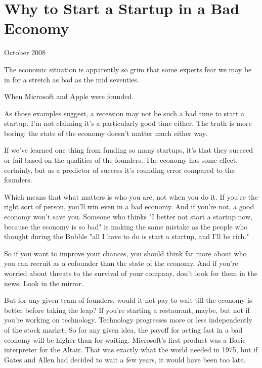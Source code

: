 \chapter{Why to Start a Startup in a Bad Economy}


            
              
                


                  
                    October 2008

The economic situation is apparently
                    so grim that some experts fear we may be in for a stretch as
                    bad as the mid seventies.

When Microsoft and
                    Apple were founded.

As those examples suggest, a
                    recession may not be such a bad time to start a startup. I'm
                    not claiming it's a particularly good time either. The truth
                    is more boring: the state of the economy doesn't matter much
                    either way.

If we've learned one thing from
                    funding so many startups, it's that they succeed or fail
                    based on the qualities of the founders. The economy has some
                    effect, certainly, but as a predictor of success it's
                    rounding error compared to the founders.

Which
                    means that what matters is who you are, not when you do it.
                    If you're the right sort of person, you'll win even in a bad
                    economy. And if you're not, a good economy won't save you.
                    Someone who thinks "I better not start a startup now,
                    because the economy is so bad" is making the same mistake as
                    the people who thought during the Bubble "all I have to do
                    is start a startup, and I'll be rich."

So if you
                    want to improve your chances, you should think far more
                    about who you can recruit as a cofounder than the state of
                    the economy. And if you're worried about threats to the
                    survival of your company, don't look for them in the news.
                    Look in the mirror.

But for any given team of
                    founders, would it not pay to wait till the economy is
                    better before taking the leap? If you're starting a
                    restaurant, maybe, but not if you're working on technology.
                    Technology progresses more or less independently of the
                    stock market. So for any given idea, the payoff for acting
                    fast in a bad economy will be higher than for waiting.
                    Microsoft's first product was a Basic interpreter for the
                    Altair. That was exactly what the world needed in 1975, but
                    if Gates and Allen had decided to wait a few years, it would
                    have been too late.

